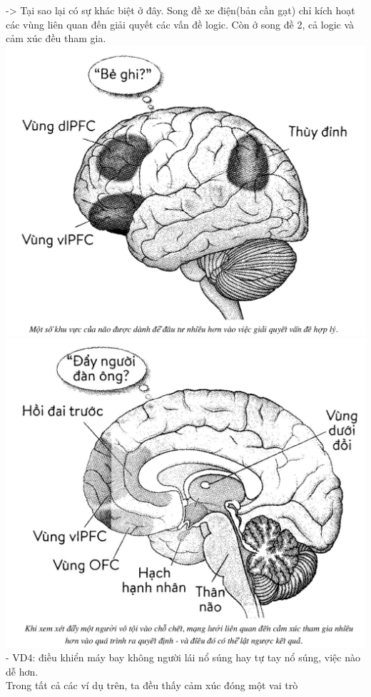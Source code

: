 \documentclass{article}
\newcommand\tab[1][1cm]{\hspace*{#1}}
\begin{document}
\tab -> Tại sao lại có sự khác biệt ở đây. Song đề xe điện(bản cần gạt) chỉ kích hoạt các vùng liên quan đến 
giải quyết các vấn đề logic. Còn ở song đề 2, cả logic và cảm xúc đều tham gia.\\
\includegraphics[width=\textwidth]{images/logic.png}
\includegraphics[width=\textwidth]{images/logicemotion.png}
\tab - VD4: điều khiển máy bay không người lái nổ súng hay tự tay nổ súng, việc nào dễ hơn.\\
\tab Trong tất cả các ví dụ trên, ta đều thấy cảm xúc đóng một vai trò 
\end{document}
